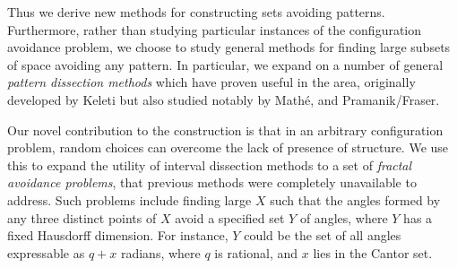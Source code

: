 Thus we derive new methods for constructing sets avoiding patterns. Furthermore, rather than studying particular instances of the configuration avoidance problem, we choose to study general methods for finding large subsets of space avoiding any pattern. In particular, we expand on a number of general {\it pattern dissection methods} which have proven useful in the area, originally developed by Keleti but also studied notably by Math\'{e}, and Pramanik/Fraser.

Our novel contribution to the construction is that in an arbitrary configuration problem, random choices can overcome the lack of presence of structure. We use this to expand the utility of interval dissection methods to a set of {\it fractal avoidance problems}, that previous methods were completely unavailable to address. Such problems include finding large $X$ such that the angles formed by any three distinct points of $X$ avoid a specified set $Y$ of angles, where $Y$ has a fixed Hausdorff dimension. For instance, $Y$ could be the set of all angles expressable as $q + x$ radians, where $q$ is rational, and $x$ lies in the Cantor set.

\endinput

Any text after an \endinput is ignored.
You could put scraps here or things in progress.